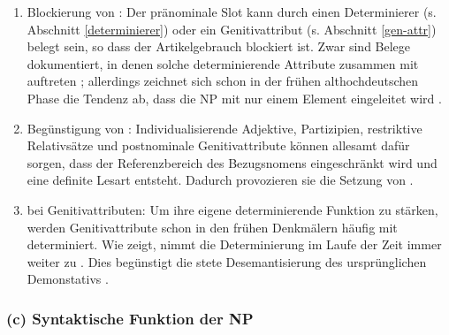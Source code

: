 \begin{enumerate}
\item Blockierung von : Der pränominale Slot kann durch einen Determinierer (s. Abschnitt \ref{determinierer}) oder ein Genitivattribut (s. Abschnitt \ref{gen-attr}) belegt sein, so dass der Artikelgebrauch blockiert ist. Zwar sind Belege dokumentiert, in denen solche determinierende Attribute zusammen  mit  auftreten \parencite[vgl. z.B. die Belegsammlungen in][60-78]{Graf1905};  allerdings zeichnet sich schon in der frühen althochdeutschen Phase die Tendenz ab, dass die NP mit nur einem Element eingeleitet wird \parencite{Oubouzar1997}.
\item Begünstigung von : Individualisierende Adjektive, Partizipien, restriktive Relativsätze und postnominale Genitivattribute können allesamt dafür sorgen, dass der Referenzbereich des Bezugsnomens eingeschränkt wird und eine definite Lesart entsteht. Dadurch provozieren sie die Setzung von  \parencite[24f.]{Schrodt2004}.
\item {} bei Genitivattributen: Um ihre eigene determinierende Funktion zu stärken, werden Genitivattribute schon in den frühen Denkmälern häufig mit  determiniert. Wie \parencite{Oubouzar1989, Oubouzar1992, Oubouzar1997} zeigt, nimmt die Determinierung im Laufe der Zeit immer weiter zu \parencite[185]{Leiss2000}. Dies begünstigt die stete Desemantisierung des ursprünglichen Demonstativs \parencite{Szczepaniak2015}.
\end{enumerate}

\subsubsection{(c) Syntaktische Funktion der NP} 

